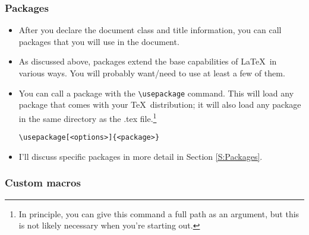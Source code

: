 \documentclass[11pt, letterpaper]{article}
\begin{document}
  
  \subsubsection{Packages}
  
    \begin{itemize}
      \item After you declare the document class and title information, you can call packages that you will use in the document.
      
      \item As discussed above, packages extend the base capabilities of \LaTeX\ in various ways. You will probably want/need to use at least a few of them.
      
      \item You can call a package with the \verb|\usepackage| command. This will load any package that comes with your \TeX\ distribution; it will also load any package in the same directory as the .tex file.\footnote{In principle, you can give this command a full path as an argument, but this is not likely necessary when you're starting out.}
      
	\begin{exe}
	  \ex \verb|\usepackage[<options>]{<package>}|
	\end{exe}
	
	

      \item I'll discuss specific packages in more detail in Section \ref{S:Packages}.
	
    \end{itemize}

  
  \subsubsection{Custom macros}
  
\end{document}

